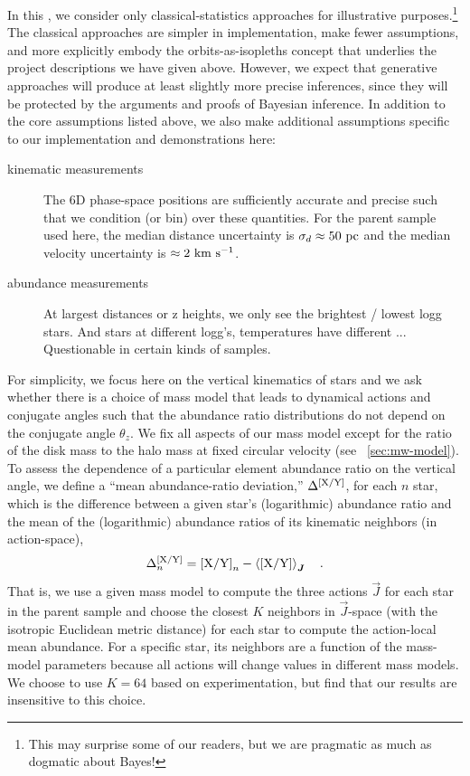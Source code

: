 \documentclass[modern]{aastex63}
\begin{document}
In this \documentname, we consider only classical-statistics approaches for
illustrative purposes.\footnote{This may surprise some of our readers, but we
are pragmatic as much as dogmatic about Bayes!}
The classical approaches are simpler in implementation, make fewer assumptions,
and more explicitly embody the orbits-as-isopleths concept that underlies the
project descriptions we have given above.
However, we expect that generative approaches will produce at least slightly
more precise inferences, since they will be protected by the arguments and
proofs of Bayesian inference.
In addition to the core assumptions listed above, we also make additional
assumptions specific to our implementation and demonstrations here:
\begin{description}
\item[kinematic measurements] The 6D phase-space positions are sufficiently
  accurate and precise such that we condition (or bin) over these quantities.
  For the parent sample used here, the median distance uncertainty is $\sigma_d
  \approx 50~\mathrm{pc}$ and the median velocity uncertainty is $\approx 2~\mathrm{km}~\mathrm{s}^{-1}$.
\item[abundance measurements] At largest distances or z heights, we only see the brightest / lowest logg stars. And stars at different logg's, temperatures have different ...  Questionable in certain
  kinds of samples.
\end{description}

For simplicity, we focus here on the vertical kinematics of stars and we ask
whether there is a choice of mass model that leads to dynamical actions and
conjugate angles such that the abundance ratio distributions do not depend on
the conjugate angle $\theta_z$.
We fix all aspects of our mass model except for the ratio of the disk mass to
the halo mass at fixed circular velocity (see \sectionname~\ref{sec:mw-model}).
To assess the dependence of a particular element abundance ratio
 on the vertical angle, we define a ``mean abundance-ratio
deviation,'' $\Delta^{{[\mathrm{X}/\mathrm{Y}]}}$, for each $n$ star, which is the
difference between a given star's (logarithmic) abundance ratio and the mean of
the (logarithmic) abundance ratios of its kinematic neighbors (in action-space),
\begin{equation}
  \Delta^{\abunratio{X}{Y}}_n = \abunratio{X}{Y}_n -
    \left\langle \abunratio{X}{Y} \right\rangle_{\vec{J}}
    \quad .
\end{equation}
That is, we use a given mass model to compute the three actions $\vec{J}$ for
each star in the parent sample and choose the closest $K$ neighbors in
$\vec{J}$-space (with the isotropic Euclidean metric distance) for each star to
compute the action-local mean abundance.
For a specific star, its neighbors are a function of the mass-model parameters
because all actions will change values in different mass models.
We choose to use $K=64$ based on experimentation, but find that our results are
insensitive to this choice.
\end{document}
